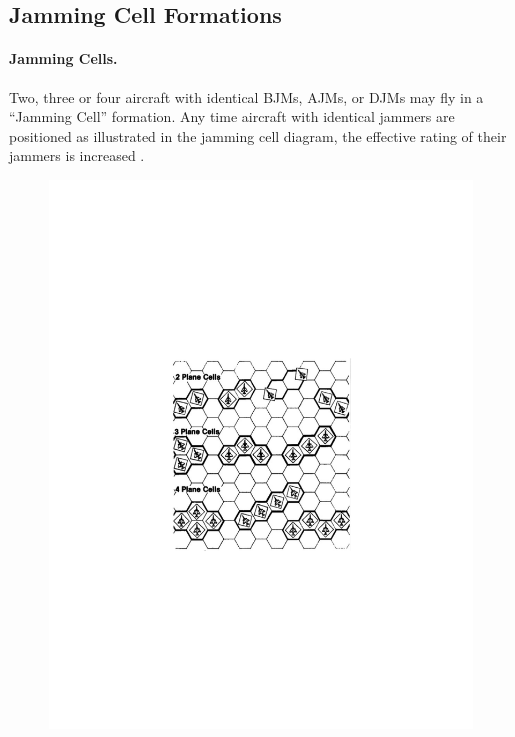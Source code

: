 \subsection{Jamming Cell Formations}

\paragraph{Jamming Cells.} Two, three or four aircraft with identical BJMs, AJMs, or DJMs may fly in a “Jamming Cell” formation. Any time aircraft with identical jammers are positioned as illustrated in the jamming cell diagram, the effective rating of their jammers is increased .

\begin{figure}[!ht]
\centering
\includegraphics[width=\linewidth]{figures/figure-jamming-cells-rules.pdf}

\medskip

\begin{minipage}{\linewidth}
\end{minipage}

\end{figure}

